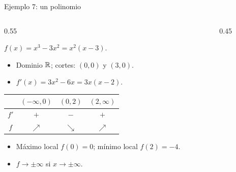 \documentclass[10pt,aspectratio=169]{beamer}
\begin{document}
\begin{frame}{Ejemplo 7: un polinomio}
  \begin{columns}
    \begin{column}{0.55\textwidth}
      \begin{ejemplo}
        $f(x)=x^3-3x^2=x^2(x-3)$.
        \begin{itemize}
          \item Dominio $\mathbb{R}$; cortes: $(0,0)$ y $(3,0)$.
          \item $f'(x)=3x^2-6x=3x(x-2)$.
        \end{itemize}
        \begin{center}
          \begin{tabular}{c|ccc}
            & $(-\infty,0)$ & $(0,2)$ & $(2,\infty)$\\ \hline
            $f'$ & $+$ & $-$ & $+$\\
            $f$ & $\nearrow$ & $\searrow$ & $\nearrow$
          \end{tabular}
        \end{center}
        \begin{itemize}
          \item Máximo local $f(0)=0$; mínimo local $f(2)=-4$.
          \item $f\to\pm\infty$ si $x\to\pm\infty$.
        \end{itemize}
      \end{ejemplo}
    \end{column}
    \begin{column}{0.45\textwidth}
      \centering
    \end{column}
  \end{columns}
\end{frame}
\end{document}
